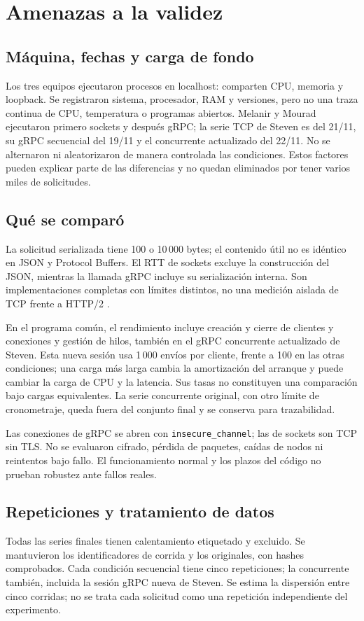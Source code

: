 \section{Amenazas a la validez}
\label{sec:validez}
\subsection{Máquina, fechas y carga de fondo}
Los tres equipos ejecutaron procesos en localhost: comparten CPU,
memoria y loopback. Se registraron sistema, procesador, RAM y versiones,
pero no una traza continua de CPU, temperatura o programas abiertos.
Melanir y Mourad ejecutaron primero sockets y después gRPC; la serie
TCP de Steven es del 21/11, su gRPC secuencial del 19/11 y el
concurrente actualizado del 22/11. No se alternaron ni
aleatorizaron de manera controlada las condiciones. Estos factores
pueden explicar parte de las diferencias y no quedan eliminados por
tener varios miles de solicitudes.

\subsection{Qué se comparó}
La solicitud serializada tiene 100 o 10\,000 bytes; el contenido útil
no es idéntico en JSON y Protocol Buffers. El RTT de sockets excluye
la construcción del JSON, mientras la llamada gRPC incluye su
serialización interna. Son implementaciones completas con límites
distintos, no una medición aislada de TCP frente a HTTP/2
\cite{blinowski2026rpc,jackson2024streaming}.

En el programa común, el rendimiento incluye creación y cierre de
clientes y conexiones y gestión de hilos, también en el gRPC concurrente
actualizado de Steven. Esta nueva sesión usa 1\,000 envíos por cliente,
frente a 100 en las otras condiciones; una carga más larga cambia la
amortización del arranque y puede cambiar la carga de CPU y la latencia.
Sus tasas no constituyen una comparación bajo cargas equivalentes.
La serie concurrente original, con otro límite de cronometraje, queda
fuera del conjunto final y se conserva para trazabilidad.

Las conexiones de gRPC se abren con \texttt{insecure\_channel}; las
de sockets son TCP sin TLS. No se evaluaron cifrado, pérdida de paquetes,
caídas de nodos ni reintentos bajo fallo. El funcionamiento normal y
los plazos del código no prueban robustez ante fallos reales.

\subsection{Repeticiones y tratamiento de datos}
Todas las series finales tienen calentamiento etiquetado y excluido.
Se mantuvieron los identificadores de corrida y los originales, con
hashes comprobados. Cada condición secuencial tiene cinco repeticiones;
la concurrente también, incluida la sesión gRPC nueva de Steven.
Se estima la dispersión entre cinco corridas; no se trata cada
solicitud como una repetición independiente del experimento.

